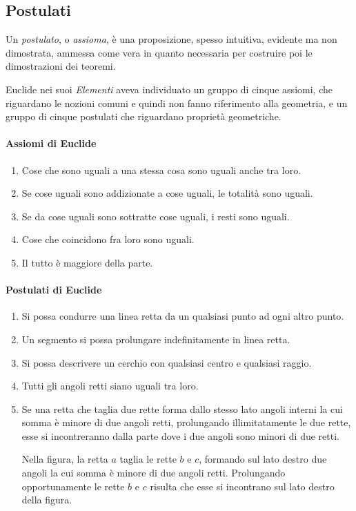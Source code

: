 \subsection{Postulati}

Un \emph{postulato}, o \emph{assioma}, è una proposizione, spesso intuitiva, evidente ma non dimostrata, ammessa come vera in quanto necessaria per costruire poi le dimostrazioni dei teoremi.

Euclide nei suoi \emph{Elementi} aveva individuato un gruppo di cinque assiomi, che riguardano le nozioni comuni e quindi non fanno riferimento alla geometria, e un gruppo di cinque postulati che riguardano proprietà geometriche.

\paragraph{Assiomi di Euclide}
\begin{enumerate}[label=\Roman{*}.]
\item Cose che sono uguali a una stessa cosa sono uguali anche tra loro.
\item Se cose uguali sono addizionate a cose uguali, le totalità sono uguali.
\item Se da cose uguali sono sottratte cose uguali, i resti sono uguali.
\item Cose che coincidono fra loro sono uguali.
\item Il tutto è maggiore della parte.
\end{enumerate}

\paragraph{Postulati di Euclide}
\begin{enumerate}[label=\Roman{*}.]
\item Si possa condurre una linea retta da un qualsiasi punto ad ogni altro punto.
\item Un segmento si possa prolungare indefinitamente in linea retta.
\item Si possa descrivere un cerchio con qualsiasi centro e qualsiasi raggio.
\item Tutti gli angoli retti siano uguali tra loro.
\item Se una retta che taglia due rette forma dallo stesso lato angoli interni la cui somma è minore di due angoli retti, prolungando illimitatamente le due rette, esse si incontreranno dalla parte dove i due angoli sono minori di due retti.

 \begin{minipage}{.45\textwidth}
 \centering
 \end{minipage}\hfil
 \begin{minipage}{.45\textwidth}
 Nella figura, la retta $a$ taglia le rette $b$ e $c$, formando sul lato destro due angoli la cui somma è minore di due angoli retti. Prolungando opportunamente le rette $b$ e $c$ risulta che esse si incontrano sul lato destro della figura.
  \end{minipage}
\end{enumerate}

